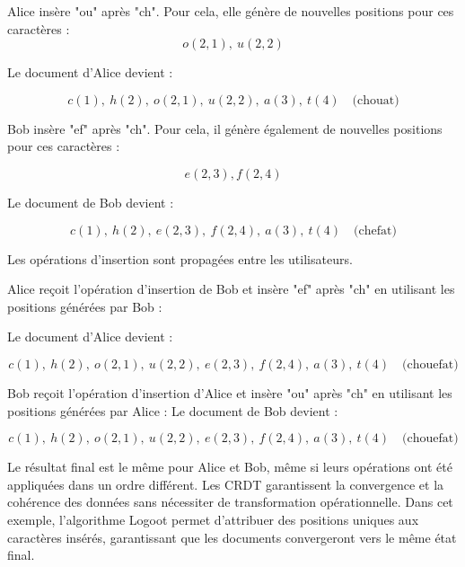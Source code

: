Alice insère "ou" après "ch". Pour cela, elle génère de nouvelles positions pour ces caractères :
\begin{equation}
    o(2, 1), \ u(2, 2)
\end{equation}

Le document d'Alice devient :

\begin{equation}
    c(1), \ h(2), \ o(2, 1), \ u(2, 2), \ a(3), \ t(4) \quad \text{(chouat)}
\end{equation}

Bob insère "ef" après "ch". Pour cela, il génère également de nouvelles positions pour ces caractères :

\begin{equation}
    e(2, 3), f(2, 4)
\end{equation}

Le document de Bob devient :

\begin{equation}
    c(1), \ h(2), \ e(2, 3), \ f(2, 4), \ a(3), \ t(4) \quad \text{(chefat)}
\end{equation}

Les opérations d'insertion sont propagées entre les utilisateurs.

Alice reçoit l'opération d'insertion de Bob et insère "ef" après "ch" en utilisant les positions générées par Bob :

Le document d'Alice devient :

\begin{equation}
    c(1), \ h(2), \ o(2, 1), \ u(2, 2), \ e(2, 3), \ f(2, 4), \ a(3), \ t(4) \quad \text{(chouefat)}
\end{equation}

Bob reçoit l'opération d'insertion d'Alice et insère "ou" après "ch" en utilisant les positions générées par Alice :
Le document de Bob devient :

\begin{equation}
    c(1), \ h(2), \ o(2, 1), \ u(2, 2), \ e(2, 3), \ f(2, 4), \ a(3), \ t(4) \quad \text{(chouefat)}
\end{equation}

Le résultat final est le même pour Alice et Bob, même si leurs opérations ont été appliquées dans un ordre différent. Les CRDT garantissent la convergence et la cohérence des données sans nécessiter de transformation opérationnelle. Dans cet exemple, l'algorithme Logoot permet d'attribuer des positions uniques aux caractères insérés, garantissant que les documents convergeront vers le même état final.

